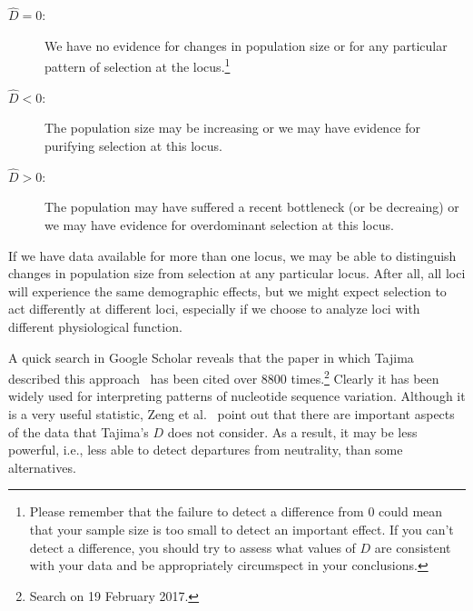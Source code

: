 \begin{description}

\item[$\hat D = 0$:] We have no evidence for changes in population
  size or for any particular pattern of selection at the
  locus.\footnote{Please remember that the failure to detect a difference
    from 0 could mean that your sample size is too small to detect an
    important effect. If you can't detect a difference, you should try
    to assess what values of $D$ are consistent with your data and be
    appropriately circumspect in your conclusions.}

\item[$\hat D < 0$:] The population size may be increasing or we may
  have evidence for purifying selection at this locus.

\item[$\hat D > 0$:] The population may have suffered a recent
  bottleneck (or be decreaing) or we may have evidence for
  overdominant selection at this locus.

\end{description}

\noindent If we have data available for more than one locus, we may be
able to distinguish changes in population size from selection at any
particular locus. After all, all loci will experience the same
demographic effects, but we might expect selection to act differently
at different loci, especially if we choose to analyze loci with
different physiological function.

A quick search in Google Scholar reveals that the paper in which
Tajima described this approach~\cite{Tajima89} has been cited over
8800 times.\footnote{Search on 19 February 2017.} Clearly it has been
widely used for interpreting patterns of nucleotide sequence
variation. Although it is a very useful statistic, Zeng et
al.~\cite{Zeng-etal-2006} point out that there are important aspects
of the data that Tajima's $D$ does not consider. As a result, it may
be less powerful, i.e., less able to detect departures from
neutrality, than some alternatives.

